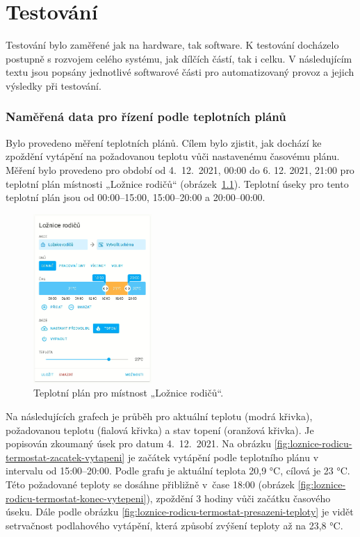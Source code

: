 \chapter{Testování}

Testování bylo zaměřené jak na hardware, tak software. K testování docházelo postupně s rozvojem celého systému, jak dílčích částí, tak i celku. V následujícím textu jsou popsány jednotlivé softwarové části pro automatizovaný provoz a jejich výsledky při testování.

\subsection{Naměřená data pro řízení podle teplotních plánů}

Bylo provedeno měření teplotních plánů. Cílem bylo zjistit, jak dochází ke zpoždění vytápění na požadovanou teplotu vůči nastavenému časovému plánu. Měření bylo provedeno pro období od 4.~12.~2021, 00:00 do 6. 12. 2021, 21:00 pro teplotní plán místnosti „Ložnice rodičů“ (obrázek~\ref{fig:teplotni-plan-loznice-rodicu}). Teplotní úseky pro tento teplotní plán jsou od 00:00–15:00, 15:00–20:00 a 20:00–00:00.

\begin{figure}[H]
    \centering
    \includegraphics[width=0.4\textwidth]{images/testovani/teplotni-plany/teplotni-plan-loznice-rodicu.png}
    \caption{Teplotní plán pro místnost „Ložnice rodičů“.}
    \label{fig:teplotni-plan-loznice-rodicu}
\end{figure}

Na následujících grafech je průběh pro aktuální teplotu (modrá křivka), požadovanou teplotu (fialová křivka) a stav topení (oranžová křivka). Je popisován zkoumaný úsek pro datum 4.~12.~2021. Na obrázku \ref{fig:loznice-rodicu-termostat-zacatek-vytapeni} je začátek vytápění podle teplotního plánu v intervalu od 15:00–20:00. Podle grafu je aktuální teplota 20,9 °C, cílová je 23 °C. Této požadované teploty se dosáhne přibližně v~čase 18:00 (obrázek \ref{fig:loznice-rodicu-termostat-konec-vytepeni}), zpoždění 3 hodiny vůči začátku časového úseku. Dále podle obrázku \ref{fig:loznice-rodicu-termostat-presazeni-teploty} je vidět setrvačnost podlahového vytápění, která způsobí zvýšení teploty až na 23,8 °C.

